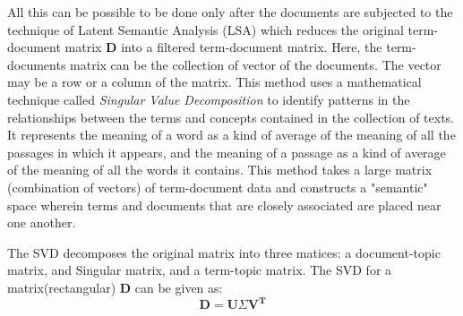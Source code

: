 \documentclass[12pt]{report}
\begin{document}
        All this can be possible to be done only after the documents are subjected to the technique of Latent Semantic Analysis (LSA)\cite{deerwester1990indexing}
        which reduces the
        original term-document matrix \textbf{D} into a filtered term-document matrix. Here, the term-documents matrix can be the collection of vector of the documents.
        The vector may be a row or a column of the matrix.
        This method uses a mathematical technique called \emph{Singular Value Decomposition} to identify patterns in the relationships between the terms and
        concepts contained in the collection of texts. It represents the meaning of a word as a kind of average of the meaning of all the passages in which it appears,
        and the meaning of a passage as a kind of average of the meaning of all the words it contains\cite{landauer1998introduction}.
        This method takes a large matrix (combination of vectors) of term-document data and constructs a "semantic" space wherein terms and documents that are closely associated
        are placed near one another.

        The SVD decomposes the original matrix into three matices: a document-topic matrix, and Singular matrix, and a term-topic matrix.
        The SVD for a matrix(rectangular) \textbf{D} can be given as:
        \begin{equation}\label{eq1}
            \mathbf{D} = \mathbf{U} \Sigma  \mathbf{V^T}
        \end{equation}
\end{document}
